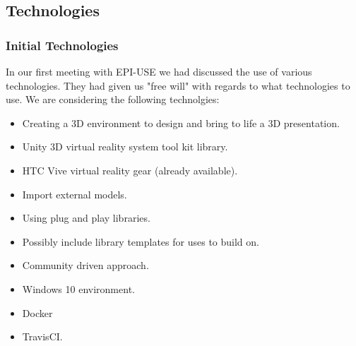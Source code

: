 \subsection{Technologies}
	\subsubsection{Initial Technologies}
		In our first meeting with EPI-USE we had discussed the use of various technologies. They had given us "free will" with regards to what technologies to use. We are considering the following technolgies:
		\begin{itemize}
			\item Creating a 3D environment to design and bring to life a 3D presentation.
			\item Unity 3D virtual reality system tool kit library.
			\item HTC Vive virtual reality gear (already available).
			\item Import external models.
			\item Using plug and play libraries.
			\item Possibly include library templates for uses to build on.
			\item Community driven approach.
			\item Windows 10 environment.
			\item Docker
			\item TravisCI.
		\end{itemize}

